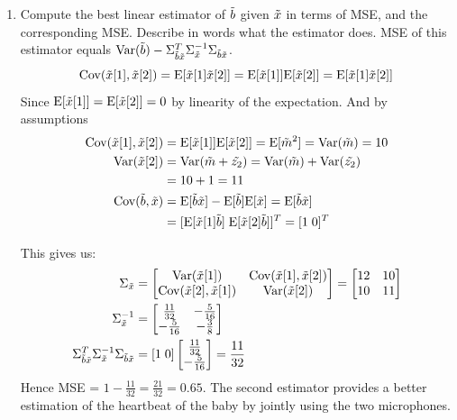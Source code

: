 \documentclass[12pt,twoside]{article}
\begin{document}
\begin{enumerate}
\begin{enumerate}
\item Compute the best linear estimator of $\tilde{  b }$ given $\tilde{  x }$ in terms of MSE, and the corresponding MSE. Describe in words what the estimator does. 
MSE of this estimator equals $\var(\rb) - \Sigma_{\rb\rx}^T \Sigma_{\rx}^{-1} \Sigma_{\rb\rx}$.
$$\cov(\rx[1], \rx[2]) = \E[\rx[1]  \rx[2]] = \E[\rx[1]] \E[\rx[2]] =   \E[\rx[1] \rx[2]]$$ Since $\mathrm{E}[\tilde{  x }[1]] = \mathrm{E}[\tilde{  x }[2]] = 0$ by linearity of the expectation.
And by assumptions 
\begin{align*}
	\cov(\rx[1], \rx[2]) 	&= 	\E[\rx[1]]  \E[\rx[2]] = \E[\rnd{m}^2] = \var(\rnd{m}) = 10	\\
	 \var(\rx[2])		&=	\var(\rnd{m} + \rnd{z_2}) = \var(\rnd{m}) + \var(\rnd{z_2}) 	\\
	 				&=	10 + 1 = 11	\\
	\cov(\rb, \rx)		&=	\E[\rb \rx] - \E[\rb] \E[\rx] = \E[\rb \rx] \\
					&= 	[\E[\rx[1] \rb] \; \E[\rx[2] \rb]]^T = [1 \; 0]^T
\end{align*}



This gives us:
\begin{align*}
	\Sigma_{\rx} &= 
	\begin{bmatrix}
		\var(\rx[1])	&			\cov(\rx[1], \rx[2]) \\
		\cov(\rx[2], \rx[1])	&	\var(\rx[2])		\\
	\end{bmatrix}
	=
	\begin{bmatrix}
		12	&	10 \\
		10	&	11 
	\end{bmatrix} \\
	\Sigma_{\rx}^{-1} &= 
	\begin{bmatrix}
		\frac{11}{32}	&	-\frac{5}{16} \\
		-\frac{5}{16}	&	-\frac{3}{8}
	\end{bmatrix} \\
	\Sigma_{\rb\rx}^T \Sigma_{\rx}^{-1} \Sigma_{\rb\rx} &=
	[1 \; 0] 	\begin{bmatrix} \frac{11}{32} \\ -\frac{5}{16} \end{bmatrix} = \frac{11}{32}
\end{align*}
Hence MSE = $ 1 - \frac{11}{32} = \frac{21}{32} = 0.65$. The second estimator provides a better estimation of the heartbeat of the baby by jointly using the two microphones.

\end{enumerate}


\end{enumerate}
\end{document}

